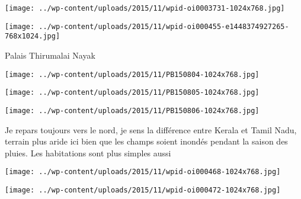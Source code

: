  

\begin{center} \texttt{[image: ../wp-content/uploads/2015/11/wpid-oi0003731-1024x768.jpg]} \end{center}

 

 

\begin{center} \texttt{[image: ../wp-content/uploads/2015/11/wpid-oi000455-e1448374927265-768x1024.jpg]} \end{center}

 

 Palais Thirumalai Nayak 

 

\begin{center} \texttt{[image: ../wp-content/uploads/2015/11/PB150804-1024x768.jpg]} \end{center}

 

 

\begin{center} \texttt{[image: ../wp-content/uploads/2015/11/PB150805-1024x768.jpg]} \end{center}

 

 

\begin{center} \texttt{[image: ../wp-content/uploads/2015/11/PB150806-1024x768.jpg]} \end{center}

 

 Je repars toujours vers le nord, je sens la différence entre Kerala et Tamil Nadu, terrain plus aride ici bien que les champs soient inondés pendant la saison des pluies. Les habitations sont plus simples aussi 

 

\begin{center} \texttt{[image: ../wp-content/uploads/2015/11/wpid-oi000468-1024x768.jpg]} \end{center}

 

 

\begin{center} \texttt{[image: ../wp-content/uploads/2015/11/wpid-oi000472-1024x768.jpg]} \end{center}

 


